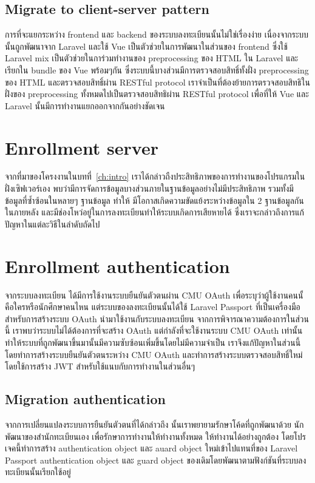 \subsection{Migrate to client-server pattern}

การที่จะแยกระหว่าง frontend และ backend ของระบบลงทะเบียนนั้นไม่ใช่เรื่องง่าย เนื่องจากระบบนั้นถูกพัฒนาจาก Laravel และใช้ Vue เป็นตัวช่วยในการพัฒนาในส่วนของ frontend ซึ่งใช้ Laravel mix เป็นตัวช่วยในการ่วมทำงานของ preprocessing ของ HTML ใน Laravel และเรียกใน bundle ของ Vue พร้อมๆกัน ซึ่งระบบนี้บางส่วนมีการตรวจสอบสิทธิ์ทั้งฝั่ง preprocessing ของ HTML และตรวจสอบสิทธิ์ผ่าน RESTful protocol เราจำเป็นที่ต้องย้ายการตรวจสอบสิทธิในฝั่งของ preprocessing ทั้งหมดไปเป็นตรวจสอบสิทธิผ่าน RESTful protocol เพื่อที่ให้ Vue และ Laravel นั้นมีการทำงานแยกออกจากกันอย่างชัดเจน

\section{Enrollment server}

จากที่มาของโครงงานในบทที่~\ref{ch:intro} เราได้กล่าวถืงประสิทธิภาพของการทำงานของโปรแกรมในฝั่งเซิฟเวอร์เอง พบว่ามีการจัดการข้อมูลบางส่วนภายในฐานข้อมูลอย่างไม่มีประสิทธิภาพ รวมทั้งมีข้อมูลที่ซ้ำซ้อนในหลายๆ ฐานข้อมูล ทำให้ มีโอกาสเกิดความขัดแย้งระหว่างข้อมูลใน 2 ฐานข้อมูลกันในภายหลัง และมีช่องโหว่อยู่ในการลงทะเบียนทำให้ระบบเกิดการเสียหายได้ ซึ่งเราจะกล่าวถึงการแก้ปัญหาในแต่ละวิธีในลำดับถัดไป

\section{Enrollment authentication}
จากระบบลงทะเบียน ได้มีการใช้งานระบบยืนยันตัวตนผ่าน CMU OAuth เพื่อระบุว่าผู้ใช้งานคนนั้คือใครหรือนักศึกษาคนไหน แต่ระบบของลงทะเบียนนั้นได้ใช้ Laravel Passport ที่เป็นเครื่องมือสำหรับการสร้างระบบ OAuth นำมาใช้งานกับระบบลงทะเบียน จากการพิจารณาความต้องการในส่วนนี้ เราพบว่าระบบไม่ได้ต้องการที่จะสร้าง OAuth แต่กำลังที่จะใช้งานระบบ CMU OAuth เท่านั้น ทำให้ระบบที่ถูกพัฒนาขึ้นมานั้นมีความซับซ้อนเพิ่มขึ้นโดยไม่มีความจำเป็น เราจึงแก้ปัญหาในส่วนนี้โดยทำการสร้างระบบยืนยันตัวตนระหว่าง CMU OAuth และทำการสร้างระบบตรวจสอบสิทธิ์ใหม่โดยใช้การสร้าง JWT สำหรับใช้แนบกับการทำงานในส่วนอื่นๆ

\subsection{Migration authentication}
จากการเปลี่ยนแปลงระบบการยืนยันตัวตนที่ได้กล่าวถึง นั้นเราพยายามรักษาโค้ดที่ถูกพัฒนาด้วย นักพัฒนาของสำนักทะเบียนเอง เพื่อรักษาการทำงานให้ทำงานทั้งหมด ให้ทำงานได้อย่างถูกต้อง โดยโปรเจคนี้ทำการสร้าง authentication object และ auard object ใหม่เข้าไปแทนที่ของ Laravel Passport authentication object และ guard object ของเดิมโดยพัฒนาตามฟังก์ชันที่ระบบลงทะเบียนนั้นเรียกใช้อยู่

